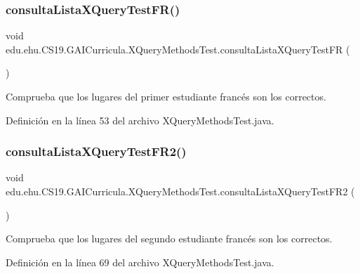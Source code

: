\subsubsection{\texorpdfstring{consultaListaXQueryTestFR()}{consultaListaXQueryTestFR()}}
{\footnotesize\ttfamily void edu.\+ehu.\+C\+S19.\+G\+A\+I\+Curricula.\+X\+Query\+Methods\+Test.\+consulta\+Lista\+X\+Query\+Test\+FR (\begin{DoxyParamCaption}{ }\end{DoxyParamCaption})}



Comprueba que los lugares del primer estudiante francés son los correctos. 



Definición en la línea 53 del archivo X\+Query\+Methods\+Test.\+java.

\mbox{\label{classedu_1_1ehu_1_1_c_s19_1_1_g_a_i_curricula_1_1_x_query_methods_test_ab30b1e554a49678887f748e9050ec173}} 
\subsubsection{\texorpdfstring{consultaListaXQueryTestFR2()}{consultaListaXQueryTestFR2()}}
{\footnotesize\ttfamily void edu.\+ehu.\+C\+S19.\+G\+A\+I\+Curricula.\+X\+Query\+Methods\+Test.\+consulta\+Lista\+X\+Query\+Test\+F\+R2 (\begin{DoxyParamCaption}{ }\end{DoxyParamCaption})}



Comprueba que los lugares del segundo estudiante francés son los correctos. 



Definición en la línea 69 del archivo X\+Query\+Methods\+Test.\+java.

\mbox{\label{classedu_1_1ehu_1_1_c_s19_1_1_g_a_i_curricula_1_1_x_query_methods_test_a424440e0527b515a698294d6859d258a}} 
